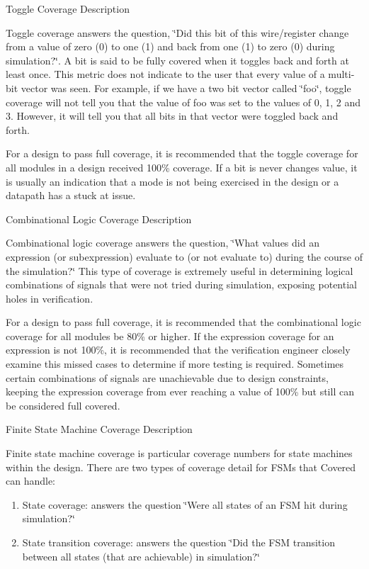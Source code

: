 \begin{Desc}
\item[Toggle Coverage Description]\par
 Toggle coverage answers the question, \char`\"{}Did this bit of this wire/register change from a value of zero (0) to one (1) and back from one (1) to zero (0) during simulation?\char`\"{}. A bit is said to be fully covered when it toggles back and forth at least once. This metric does not indicate to the user that every value of a multi-bit vector was seen. For example, if we have a two bit vector called \char`\"{}foo\char`\"{}, toggle coverage will not tell you that the value of foo was set to the values of 0, 1, 2 and 3. However, it will tell you that all bits in that vector were toggled back and forth.

 For a design to pass full coverage, it is recommended that the toggle coverage for all modules in a design received 100\% coverage. If a bit is never changes value, it is usually an indication that a mode is not being exercised in the design or a datapath has a stuck at issue.\end{Desc}
\begin{Desc}
\item[Combinational Logic Coverage Description]\par
 Combinational logic coverage answers the question, \char`\"{}What values did an expression (or  subexpression) evaluate to (or not evaluate to) during the course of the simulation?\char`\"{} This  type of coverage is extremely useful in determining logical combinations of signals that were  not tried during simulation, exposing potential holes in verification.

 For a design to pass full coverage, it is recommended that the combinational logic coverage for  all modules be 80\% or higher. If the expression coverage for an expression is not 100\%, it is recommended that the verification engineer closely examine this missed cases to determine if more testing is required. Sometimes certain combinations of signals are unachievable due to design constraints, keeping the expression coverage from ever reaching a value of 100\% but still can be considered full covered.\end{Desc}
\begin{Desc}
\item[Finite State Machine Coverage Description]\par
 Finite state machine coverage is particular coverage numbers for state machines within the design. There are two types of coverage detail for FSMs that Covered can handle:\begin{enumerate}
\item 
State coverage: answers the question \char`\"{}Were all states of an FSM hit during simulation?\char`\"{}\item 
State transition coverage: answers the question \char`\"{}Did the FSM transition between all states (that are achievable) in simulation?\char`\"{}\end{enumerate}
\end{Desc}


